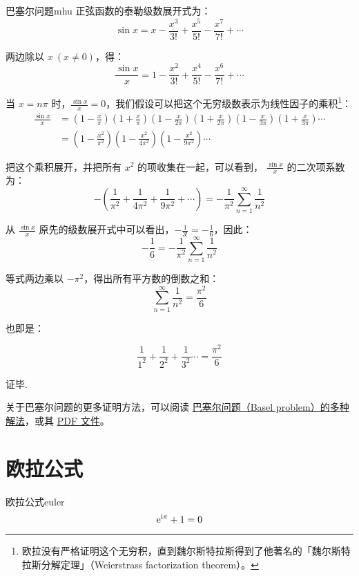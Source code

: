 \documentclass[12pt, cn]{elegantart}
\begin{document}
\begin{definition}{巴塞尔问题}{mhu}
	正弦函数的泰勒级数展开式为：
	$$
\sin x=x-\frac{x^{3}}{3 !}+\frac{x^{5}}{5 !}-\frac{x^{7}}{7 !}+\cdots
$$

两边除以 $x\ (x\neq 0)$，得：
$$
\frac{\sin x}{x}=1-\frac{x^{2}}{3 !}+\frac{x^{4}}{5 !}-\frac{x^{6}}{7 !}+\cdots
$$

当 $x=n\pi$ 时，$\frac{\sin x}{x}=0$，我们假设可以把这个无穷级数表示为线性因子的乘积\footnote{欧拉没有严格证明这个无穷积，直到魏尔斯特拉斯得到了他著名的「魏尔斯特拉斯分解定理」（Weierstrass factorization theorem）。}：
\begin{align*} \frac{\sin x}{x} &=\left(1-\frac{x}{\pi}\right)\left(1+\frac{x}{\pi}\right)\left(1-\frac{x}{2 \pi}\right)\left(1+\frac{x}{2 \pi}\right)\left(1-\frac{x}{3 \pi}\right)\left(1+\frac{x}{3 \pi}\right) \cdots \\ &=\left(1-\frac{x^{2}}{\pi^{2}}\right)\left(1-\frac{x^{2}}{4 \pi^{2}}\right)\left(1-\frac{x^{2}}{9 \pi^{2}}\right) \cdots 
\end{align*}

把这个乘积展开，并把所有 $x^2$ 的项收集在一起，可以看到， $ \frac{\sin x}{x}$ 的二次项系数为：
$$
-\left(\frac{1}{\pi^{2}}+\frac{1}{4 \pi^{2}}+\frac{1}{9 \pi^{2}}+\cdots\right)=-\frac{1}{\pi^{2}} \sum_{n=1}^{\infty} \frac{1}{n^{2}}
$$

从 $ \frac{\sin x}{x}$ 原先的级数展开式中可以看出，$ -\frac{1}{3 !}=-\frac{1}{6}$，因此：
$$
-\frac{1}{6}=-\frac{1}{\pi^{2}} \sum_{n=1}^{\infty} \frac{1}{n^{2}}
$$

等式两边乘以 $-\pi^2$，得出所有平方数的倒数之和：
$$
\sum_{n=1}^{\infty} \frac{1}{n^{2}}=\frac{\pi^{2}}{6}
$$

也即是：

$$ \frac{1}{1^{2}}+\frac{1}{2^{2}}+\frac{1}{3^{2}} \cdots=\frac{\pi^2}{6}
$$

证毕.
\end{definition}

关于巴塞尔问题的更多证明方法，可以阅读 \href{https://www.cnblogs.com/misaka01034/p/BaselProof.html}{巴塞尔问题（Basel problem）的多种解法}，或其 \href{https://tomben.me/files/pdf/23-proofs-of-basel-problem.pdf}{PDF 文件}。

\section{欧拉公式}

\begin{theorem}{欧拉公式}{euler}
	\begin{equation}
		\mathrm{e}^{\mathrm{i} \pi}+1=0
	\end{equation}
   \vspace{-15pt}
\end{theorem}
\vspace{10pt}
\end{document}
